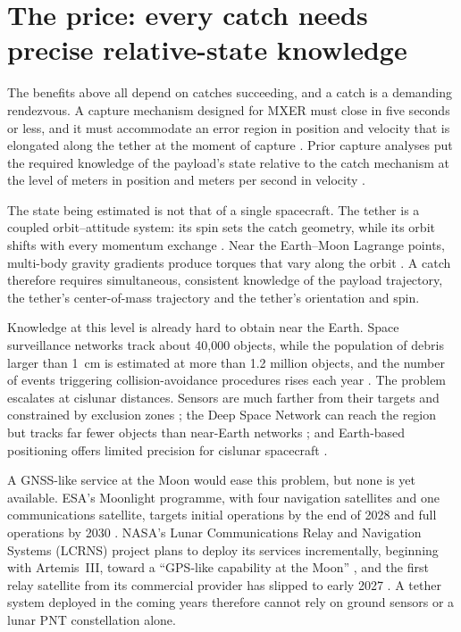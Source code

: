 \documentclass[11pt]{article}
\begin{document}
\section{The price: every catch needs precise relative-state knowledge}\label{sec:catch}

The benefits above all depend on catches succeeding, and a catch is a demanding rendezvous.
A capture mechanism designed for MXER must close in five seconds or less, and it must accommodate an error region in position and velocity that is elongated along the tether at the moment of capture \parencite{CanfieldSorensen2006}.
Prior capture analyses put the required knowledge of the payload's state relative to the catch mechanism at the level of meters in position and meters per second in velocity \parencite{Williams2005,Sorensen2001}.

The state being estimated is not that of a single spacecraft.
The tether is a coupled orbit--attitude system: its spin sets the catch geometry, while its orbit shifts with every momentum exchange \parencite{Baoyin}.
Near the Earth--Moon Lagrange points, multi-body gravity gradients produce torques that vary along the orbit \parencite{GuzzettiHowell2018,Misra2002}.
A catch therefore requires simultaneous, consistent knowledge of the payload trajectory, the tether's center-of-mass trajectory and the tether's orientation and spin.

Knowledge at this level is already hard to obtain near the Earth.
Space surveillance networks track about 40{,}000 objects, while the population of debris larger than 1~cm is estimated at more than 1.2 million objects, and the number of events triggering collision-avoidance procedures rises each year \parencite{ESASER2025}.
The problem escalates at cislunar distances.
Sensors are much farther from their targets and constrained by exclusion zones \parencite{AFRLOracle}; the Deep Space Network can reach the region but tracks far fewer objects than near-Earth networks \parencite{BakerMcEvilly2024}; and Earth-based positioning offers limited precision for cislunar spacecraft \parencite{AFRLOracle}.

A GNSS-like service at the Moon would ease this problem, but none is yet available.
ESA's Moonlight programme, with four navigation satellites and one communications satellite, targets initial operations by the end of 2028 and full operations by 2030 \parencite{ESAMoonlight2024}.
NASA's Lunar Communications Relay and Navigation Systems (LCRNS) project plans to deploy its services incrementally, beginning with Artemis~III, toward a ``GPS-like capability at the Moon'' \parencite{Espera2025LCRNS}, and the first relay satellite from its commercial provider has slipped to early 2027 \parencite{AvWeek2026IM}.
A tether system deployed in the coming years therefore cannot rely on ground sensors or a lunar PNT constellation alone.
\end{document}
